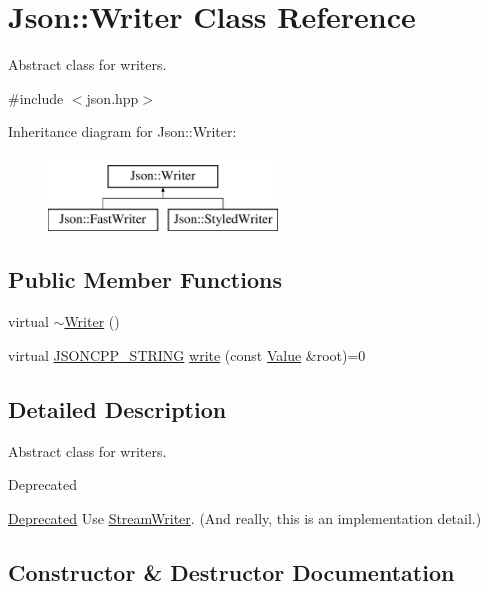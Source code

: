 \hypertarget{classJson_1_1Writer}{}\section{Json\+:\+:Writer Class Reference}
\label{classJson_1_1Writer}


Abstract class for writers.  




{\ttfamily \#include $<$json.\+hpp$>$}

Inheritance diagram for Json\+:\+:Writer\+:\begin{figure}[H]
\begin{center}
\leavevmode
\includegraphics[height=2.000000cm]{classJson_1_1Writer}
\end{center}
\end{figure}
\subsection*{Public Member Functions}
\begin{DoxyCompactItemize}
\item 
virtual \hyperlink{classJson_1_1Writer_a3e618564336f26b14921f0d840db668c}{$\sim$\+Writer} ()
\item 
virtual \hyperlink{json_8hpp_a1e723f95759de062585bc4a8fd3fa4be}{J\+S\+O\+N\+C\+P\+P\+\_\+\+S\+T\+R\+I\+NG} \hyperlink{classJson_1_1Writer_a61c55882b82c7651d0b9b683c6d3f371}{write} (const \hyperlink{classJson_1_1Value}{Value} \&root)=0
\end{DoxyCompactItemize}


\subsection{Detailed Description}
Abstract class for writers. 

\begin{DoxyRefDesc}{Deprecated}
\item[\hyperlink{deprecated__deprecated000007}{Deprecated}]Use \hyperlink{classJson_1_1StreamWriter}{Stream\+Writer}. (And really, this is an implementation detail.) \end{DoxyRefDesc}


\subsection{Constructor \& Destructor Documentation}
